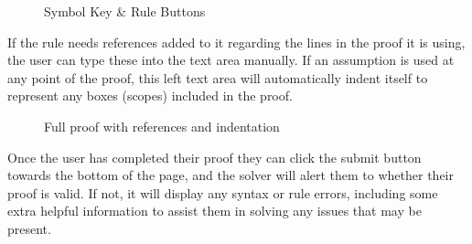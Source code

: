 \begin{figure}[!ht]
	\centering
	\caption{Symbol Key \& Rule Buttons}
\end{figure}

If the rule needs references added to it regarding the lines in the proof it is using, the user can type these into the text area manually. If an assumption is used at any point of the proof, this left text area will automatically indent itself to represent any boxes (scopes) included in the proof. 

\begin{figure}[!ht]
	\centering
	\caption{Full proof with references and indentation}
\end{figure}


Once the user has completed their proof they can click the submit button towards the bottom of the page, and the solver will alert them to whether their proof is valid. If not, it will display any syntax or rule errors, including some extra helpful information to assist them in solving any issues that may be present. 

